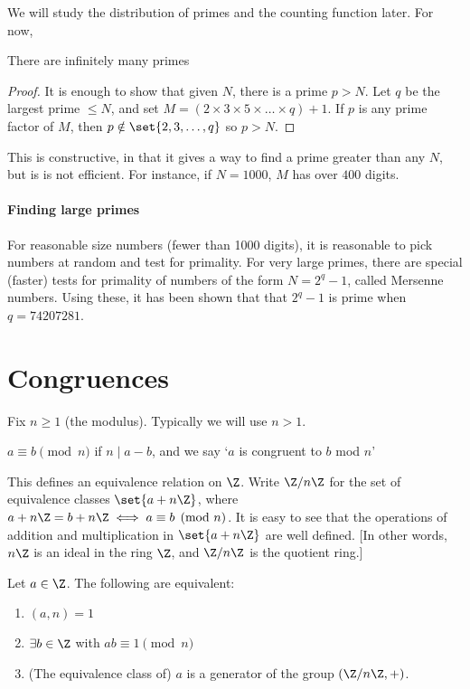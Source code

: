 \documentclass{article}
\begin{document}
We will study the distribution of primes and the counting function later.  For now,
\begin{thm}[Euclid]
    There are infinitely many primes
\end{thm}
\begin{proof}
    It is enough to show that given $N$, there is a prime $p > N$. Let $q$ be the largest prime $\leq N$, and set $M = (2 \times 3 \times 5 \times \dots \times q) + 1$. If $p$ is any prime factor of $M$, then $p \notin \set{2, 3, \dotsc, q}$ so $p > N$.
\end{proof}

\begin{remark}
    This is constructive, in that it gives a way to find a prime greater than any $N$, but is is not efficient. For instance, if $N=1000$, $M$ has over $400$ digits.
\end{remark}

\paragraph{Finding large primes} For reasonable size numbers (fewer than 1000 digits), it is reasonable to pick numbers at random and test for primality.
For very large primes, there are special (faster) tests for primality of numbers of the form $N = 2^q - 1$, called Mersenne numbers.
Using these, it has been shown that that $2^q - 1$ is prime when $q = 74207281$.

\clearpage

\section{Congruences}
Fix $n \geq 1$ (the modulus).  Typically we will use $n > 1$.
\begin{defi}
    $ a \equiv b \pmod{n}$ if $n \mid a-b$, and we say `$a$ is congruent to $b$ mod $n$'
\end{defi}

This defines an equivalence relation on $\Z$. Write $\Z / n\Z$ for the set of equivalence classes $\set{a + n \Z}$, where $a + n \Z = b + n \Z \iff a \equiv b \pmod{n}$.  It is easy to see that the operations of addition and multiplication in $\set{a + n \Z}$ are well defined.  [In other words, $n \Z$ is an ideal in the ring $\Z$, and $\Z / n\Z$ is the quotient ring.]

\begin{nlemma}\label{lem:2.1}
    Let $a \in \Z$. The following are equivalent:
    \begin{enumerate}[label=\roman*.]
        \item $(a, n) = 1$
        \item $\exists b \in \Z$ with $ab \equiv 1 \pmod{n}$
        \item (The equivalence class of) $a$ is a generator of the group $(\Z/n\Z, +)$.
    \end{enumerate}
\end{nlemma}
\end{document}
